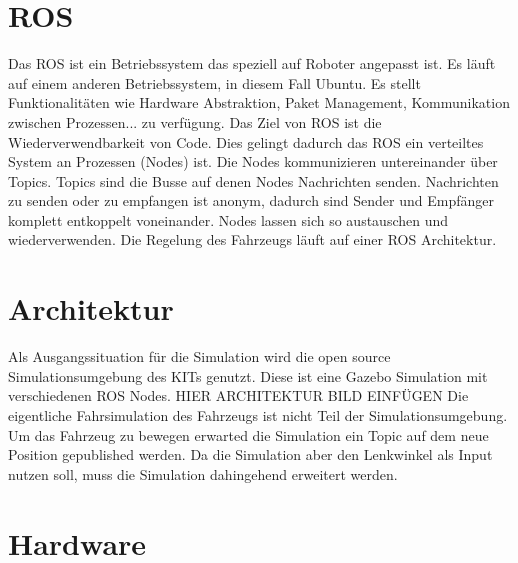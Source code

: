



\section{ROS}
Das \acf{ROS} ist ein Betriebssystem das speziell auf Roboter angepasst ist.
Es läuft auf einem anderen Betriebssystem, in diesem Fall Ubuntu.
Es stellt Funktionalitäten wie Hardware Abstraktion, Paket Management, Kommunikation zwischen Prozessen... zu verfügung.
Das Ziel von \acf{ROS} ist die Wiederverwendbarkeit von Code. 
Dies gelingt dadurch das \acf{ROS} ein verteiltes System an Prozessen (Nodes) ist. 
Die Nodes kommunizieren untereinander über Topics.
Topics sind die Busse auf denen Nodes Nachrichten senden.
Nachrichten zu senden oder zu empfangen ist anonym, dadurch sind Sender und Empfänger komplett entkoppelt voneinander.
\cite{rosTopics:2019}
Nodes lassen sich so austauschen und wiederverwenden.
\cite{rosIntro:2018}
Die Regelung des Fahrzeugs läuft auf einer ROS Architektur.


\section{Architektur}
Als Ausgangssituation für die Simulation wird die open source Simulationsumgebung des KITs genutzt.
Diese ist eine Gazebo Simulation mit verschiedenen ROS Nodes.
HIER ARCHITEKTUR BILD EINFÜGEN
Die eigentliche Fahrsimulation des Fahrzeugs ist nicht Teil der Simulationsumgebung.
Um das Fahrzeug zu bewegen erwarted die Simulation ein Topic auf dem neue Position gepublished werden.
Da die Simulation aber den Lenkwinkel als Input nutzen soll, muss die Simulation dahingehend erweitert werden.


\section{Hardware}
